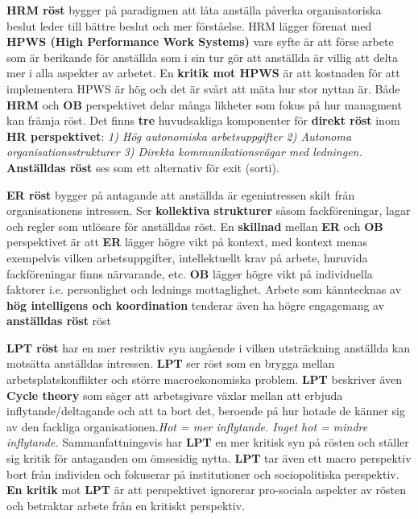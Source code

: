 \documentclass{report}
\begin{document}
	\textbf{HRM röst} bygger på paradigmen att låta anställa påverka
	organisatoriska beslut leder till bättre beslut och mer förståelse.
	HRM lägger förenat med \textbf{HPWS (High Performance Work Systems)}
	vars syfte är att förse arbete som är berikande för anställda
	som i sin tur gör att anställda är villig att delta mer i alla
	aspekter av arbetet. En \textbf{kritik mot HPWS} är att kostnaden
	för att implementera HPWS är hög och det är svårt att mäta hur
	stor nyttan är. Både \textbf{HRM} och \textbf{OB}
	perspektivet delar många likheter som fokus på hur
	managment kan främja röst. Det finns \textbf{tre}
	huvudsakliga komponenter för \textbf{direkt röst} inom \textbf{HR
	perspektivet}: \textit{1) Hög autonomiska arbetsuppgifter 2)
	Autonoma organisationsstrukturer 3) Direkta kommunikationsvägar
	med ledningen.} \textbf{Anställdas röst} ses som ett alternativ
	för exit (sorti).

	\textbf{ER röst} bygger på antagande att anställda är
	egenintressen skilt från organisationens intressen. Ser \textbf{kollektiva
	strukturer} såsom fackföreningar, lagar och regler som utlösare
	för anställdas röst. En \textbf{skillnad} mellan \textbf{ER}
	och \textbf{OB} perspektivet är att \textbf{ER} lägger
	högre vikt på kontext, med kontext menas exempelvis vilken arbetsuppgifter,
	intellektuellt krav på arbete, huruvida fackföreningar finns
	närvarande, etc. \textbf{OB} lägger högre vikt på
	individuella faktorer i.e. personlighet och lednings mottaglighet.
	Arbete som känntecknas av \textbf{hög intelligens och
	koordination} tenderar även ha högre engagemang av \textbf{anställdas
	röst} röst

	\textbf{LPT röst} har en mer restriktiv syn angående i
	vilken utsträckning anställda kan motsätta anställdas
	intressen. \textbf{LPT} ser röst som en brygga mellan
	arbetsplatskonflikter och större macroekonomiska problem. \textbf{LPT}
	beskriver även \textbf{Cycle theory} som säger att arbetsgivare
	växlar mellan att erbjuda inflytande/deltagande och att ta bort
	det, beroende på hur hotade de känner sig av den fackliga
	organisationen.\textit{Hot = mer inflytande. Inget hot = mindre
	inflytande.} Sammanfattningsvis har \textbf{LPT} en mer
	kritisk syn på rösten och ställer sig kritik för
	antaganden om ömsesidig nytta. \textbf{LPT} tar även ett
	macro perspektiv bort från individen och fokuserar på
	institutioner och sociopolitiska perspektiv. \textbf{En
	kritik} mot \textbf{LPT} är att perspektivet ignorerar pro-sociala
	aspekter av rösten och betraktar arbete från en kritiskt perspektiv.
\end{document}
